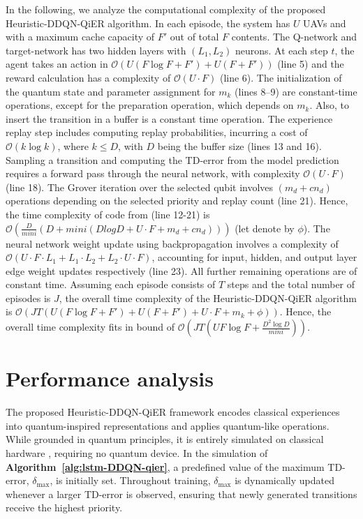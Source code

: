 \documentclass[journal]{IEEEtran}
\begin{document}
In the following, we analyze the computational complexity of the proposed Heuristic-DDQN-QiER algorithm. In each episode, the system has $U$ UAVs and with a maximum cache capacity of $F'$ out of total $F$ contents. The Q-network and target-network has two hidden layers with $(L_1, L_2)$ neurons. At each step $t$, the agent takes an action in $\mathcal{O}\left(U(F \log F + F') + U(F + F')\right)$ (line 5) and the reward calculation has a complexity of $\mathcal{O}(U \cdot F)$ (line 6). The initialization of the quantum state and parameter assignment for $m_k$ (lines 8–9) are constant-time operations, except for the preparation operation, which depends on $m_k$. Also, to insert the transition in a buffer is a constant time operation. The experience replay step includes computing replay probabilities, incurring a cost of $\mathcal{O}(k \log k)$, where $k \leq D$, with $D$ being the buffer size (lines 13 and 16). Sampling a transition and computing the TD-error from the model prediction requires a forward pass through the neural network, with complexity $\mathcal{O}(U \cdot F)$ (line 18). The Grover iteration over the selected qubit involves $(m_d + cn_d)$ operations depending on the selected priority and replay count (line 21). Hence, the time complexity of code from (line 12-21) is $\mathcal{O}{(\frac{D}{mini} (D + mini(DlogD + U\cdot F + m_d + cn_d)))}$ (let denote by $\phi$). The neural network weight update using backpropagation involves a complexity of $\mathcal{O}(U \cdot F \cdot L_1 + L_1 \cdot L_2 + L_2 \cdot U \cdot F)$, accounting for input, hidden, and output layer edge weight updates respectively (line 23). All further remaining operations are of constant time. Assuming each episode consists of $T$ steps and the total number of episodes is $J$, the overall time complexity of the Heuristic-DDQN-QiER algorithm is $
\mathcal{O}\left(JT\left(U(F \log F + F') + U(F + F') + U \cdot F + m_k + \phi\right)\right)$. Hence, the overall time complexity fits in bound of $\mathcal{O}(JT(UF \log F + \frac{D^2 \log D}{\textit{mini}}))$.




\section{Performance analysis}
The proposed Heuristic-DDQN-QiER framework encodes classical experiences into quantum-inspired representations and applies quantum-like operations. While grounded in quantum principles, it is entirely simulated on classical hardware \cite{9357477}, requiring no quantum device. In the simulation of \textbf{Algorithm~\ref{alg:lstm-DDQN-qier}}, a predefined value of the maximum TD-error, $\delta_{\max}$, is initially set. Throughout training, $\delta_{\max}$ is dynamically updated whenever a larger TD-error is observed, ensuring that newly generated transitions receive the highest priority.
\end{document}
